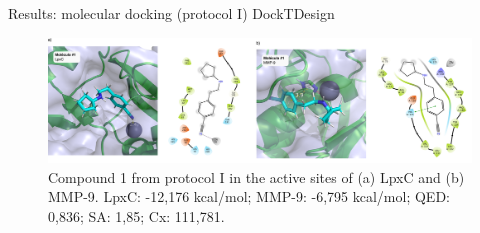\documentclass[aspectratio=169,xcolor=dvipsnames]{beamer}
\begin{document}






\begin{frame}{Results: molecular docking (protocol I) \hfill {\footnotesize \alert{DockTDesign}}}
    \begin{figure}
        \centering
        \includegraphics[width=1\textwidth]{imgs/results/figure-compound1-protocol1-h.png}
        \caption{Compound 1 from protocol I in the active sites of (a) LpxC and (b) MMP-9. LpxC: -12{,}176 kcal/mol; MMP-9: -6{,}795 kcal/mol; QED: 0{,}836; SA: 1{,}85; Cx: 111{,}781.}
    \end{figure}
\end{frame}
\end{document}
